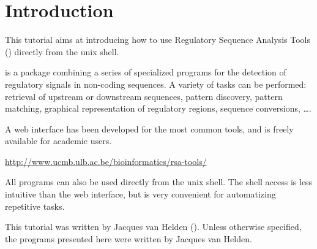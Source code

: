 
\section{Introduction}

This tutorial aims at introducing how to use Regulatory Sequence
Analysis Tools (\RSAT) directly from the unix shell.

\RSAT is a package combining a series of specialized programs for the
detection of regulatory signals in non-coding sequences. A variety of
tasks can be performed: retrieval of upstream or downstream sequences,
pattern discovery, pattern matching, graphical representation of
regulatory regions, sequence conversions, \ldots.

A web interface has been developed for the most common tools, and is
freely available for academic users.

\url{http://www.ucmb.ulb.ac.be/bioinformatics/rsa-tools/}

All programs can also be used directly from the unix shell. The shell
access is less intuitive than the web interface, but is very
convenient for automatizing repetitive tasks.

This tutorial was written by Jacques van Helden
().  Unless otherwise specified, the
programs presented here were written by Jacques van Helden.
